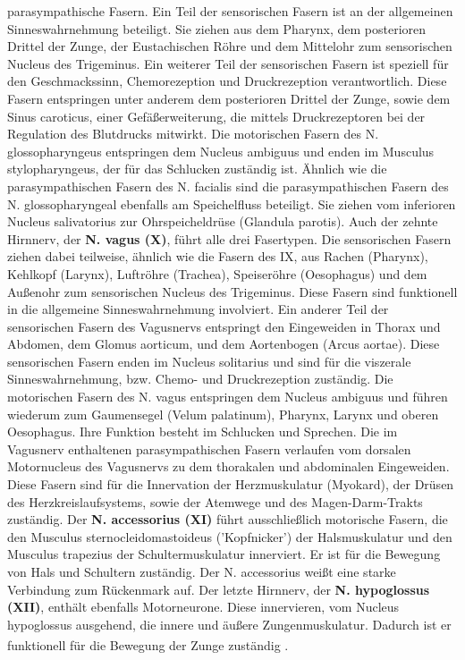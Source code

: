 \documentclass[12pt,a4paper,pdftex]{article}
\begin{document}
parasympathische Fasern. Ein Teil der sensorischen Fasern ist an der allgemeinen Sinneswahrnehmung beteiligt. Sie ziehen aus dem Pharynx, dem posterioren Drittel der Zunge, der Eustachischen Röhre und dem Mittelohr zum sensorischen Nucleus des Trigeminus. Ein weiterer Teil der sensorischen Fasern ist speziell für den Geschmackssinn, Chemorezeption und Druckrezeption verantwortlich. Diese Fasern entspringen unter anderem dem posterioren Drittel der Zunge, sowie dem Sinus caroticus, einer Gefäßerweiterung, die mittels Druckrezeptoren bei der Regulation des Blutdrucks mitwirkt. Die motorischen Fasern des N. glossopharyngeus entspringen dem Nucleus ambiguus und enden im Musculus stylopharyngeus, der für das Schlucken zuständig ist. Ähnlich wie die parasympathischen Fasern des N. facialis sind die parasympathischen Fasern des N. glossopharyngeal ebenfalls am Speichelfluss beteiligt. Sie ziehen vom inferioren Nucleus salivatorius zur Ohrspeicheldrüse (Glandula parotis). Auch der zehnte Hirnnerv, der \textbf{N. vagus (X)}, führt alle drei Fasertypen. Die sensorischen Fasern ziehen dabei teilweise, ähnlich wie die Fasern des IX, aus Rachen (Pharynx), Kehlkopf (Larynx), Luftröhre (Trachea), Speiseröhre (Oesophagus) und dem Außenohr zum sensorischen Nucleus des Trigeminus. Diese Fasern sind funktionell in die allgemeine Sinneswahrnehmung involviert. 
Ein anderer Teil der sensorischen Fasern des Vagusnervs entspringt den Eingeweiden in Thorax und Abdomen, dem Glomus aorticum, und dem Aortenbogen (Arcus aortae). Diese sensorischen Fasern enden im Nucleus solitarius und sind für die viszerale Sinneswahrnehmung, bzw. Chemo- und Druckrezeption zuständig. Die motorischen Fasern des N. vagus entspringen dem Nucleus ambiguus und führen wiederum zum Gaumensegel (Velum palatinum), Pharynx, Larynx und oberen Oesophagus. Ihre Funktion besteht im Schlucken und Sprechen. Die im Vagusnerv enthaltenen parasympathischen Fasern verlaufen vom dorsalen Motornucleus des Vagusnervs zu dem thorakalen und abdominalen Eingeweiden. Diese Fasern sind für die Innervation der Herzmuskulatur (Myokard), der Drüsen des Herzkreislaufsystems, sowie der Atemwege und des Magen-Darm-Trakts zuständig. Der \textbf{N. accessorius (XI)} führt ausschließlich motorische Fasern, die den Musculus sternocleidomastoideus ('Kopfnicker') der Halsmuskulatur und den Musculus trapezius der Schultermuskulatur innerviert. Er ist für die Bewegung von Hals und Schultern zuständig. Der N. accessorius weißt eine starke Verbindung zum Rückenmark auf. Der letzte Hirnnerv, der \textbf{N. hypoglossus (XII)}, enthält ebenfalls Motorneurone. Diese innervieren, vom Nucleus hypoglossus ausgehend, die innere und äußere Zungenmuskulatur. Dadurch ist er funktionell für die Bewegung der Zunge zuständig \textsuperscript{\cite[10]{crossman2014neuroanatomy}}.
\end{document}
